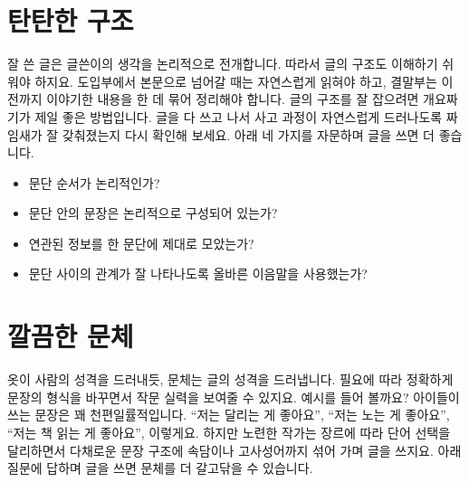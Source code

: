 \documentclass{translation}
\begin{document}
\section{탄탄한 구조}

잘 쓴 글은 글쓴이의 생각을 논리적으로 전개합니다.
따라서 글의 구조도 이해하기 쉬워야 하지요.
도입부에서 본문으로 넘어갈 때는 자연스럽게 읽혀야 하고, 결말부는 이전까지 이야기한 내용을 한 데 묶어 정리해야 합니다.
글의 구조를 잘 잡으려면 개요짜기가 제일 좋은 방법입니다.
글을 다 쓰고 나서 사고 과정이 자연스럽게 드러나도록 짜임새가 잘 갖춰졌는지 다시 확인해 보세요.
아래 네 가지를 자문하며 글을 쓰면 더 좋습니다.

\begin{itemize}
\item 문단 순서가 논리적인가?
\item 문단 안의 문장은 논리적으로 구성되어 있는가?
\item 연관된 정보를 한 문단에 제대로 모았는가?
\item 문단 사이의 관계가 잘 나타나도록 올바른 이음말을 사용했는가?
\end{itemize}

\section{깔끔한 문체}

옷이 사람의 성격을 드러내듯, 문체는 글의 성격을 드러냅니다.
필요에 따라 정확하게 문장의 형식을 바꾸면서 작문 실력을 보여줄 수 있지요.
예시를 들어 볼까요?
아이들이 쓰는 문장은 꽤 천편일률적입니다. ``저는 달리는 게 좋아요'', ``저는 노는 게 좋아요'', ``저는 책 읽는 게 좋아요'', 이렇게요.
하지만 노련한 작가는 장르에 따라 단어 선택을 달리하면서 다채로운 문장 구조에 속담이나 고사성어까지 섞어 가며 글을 쓰지요.
아래 질문에 답하며 글을 쓰면 문체를 더 갈고닦을 수 있습니다.
\end{document}
